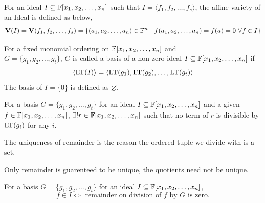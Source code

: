 \documentclass[a4paper,11pt]{article}
\begin{document}
\begin{defn}
    For an ideal $I\subseteq\mathbb{F}[x_1, x_2, \ldots, x_n]$ such that $I=\langle f_1,f_2,\ldots,f_s\rangle$, the affine variety of an Ideal is defined as below,
    \begin{equation}
        \textbf{V}(I) = \textbf{V}(f_1,f_2,\ldots,f_s) = \{(a_1, a_2, \ldots, a_n) \in \mathbb{F}^n \ |\ f(a_1, a_2, \ldots, a_n)=f(a)=0 \ \forall f\in I \}
    \end{equation}
\end{defn}
\begin{defn}
    For a fixed monomial ordering on $\mathbb{F}[x_1, x_2, \ldots, x_n]$ and \\$G = \{g_1, g_2, \ldots, g_t\}$, $G$ is called a \Grob basis of a non-zero ideal $ I  \subseteq\mathbb{F}[x_1, x_2, \ldots, x_n]$ if
    \begin{equation}
        \langle \operatorname{LT}(I)\rangle = \langle \operatorname{LT}(g_1), \operatorname{LT}(g_2), \ldots, \operatorname{LT}(g_t)\rangle
    \end{equation}
    The \Grob basis of $I=\{0\}$ is defined as $\varnothing$.
\end{defn}
\begin{prop}
    For a \Grob basis $G = \{g_1, g_2, \ldots, g_t\}$ for an ideal $I\subseteq\mathbb{F}[x_1, x_2, \ldots, x_n]$ and a given $f\in\mathbb{F}[x_1, x_2, \ldots, x_n]$, $\exists!r\in\mathbb{F}[x_1, x_2, \ldots, x_n]$ such that no term of $r$ is divisible by $\operatorname{LT}(g_i)$ for any $i$.

    The uniqueness of remainder is the reason the ordered tuple we divide with is a set.
\end{prop}
\begin{note}
    Only remainder is guarenteed to be unique, the quotients need not be unique.
\end{note}
\begin{theorem}
    For a \Grob basis $G = \{g_1, g_2, \ldots, g_t\}$ for an ideal $I\subseteq\mathbb{F}[x_1, x_2, \ldots, x_n]$,
    \begin{equation}
         f\in I\Leftrightarrow \text{ remainder on division of } f \text{ by } G \text{ is zero}.
    \end{equation}
\end{theorem}
\end{document}
